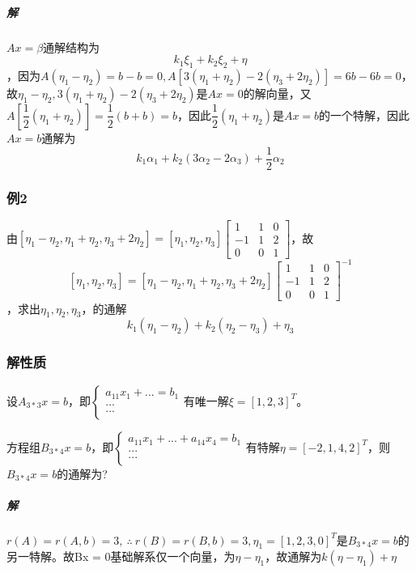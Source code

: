 \subparagraph{解}
\(Ax = \beta\)通解结构为\[k_1\xi_1 + k_2\xi_2 + \eta\]，因为\(A(\eta_1 - \eta_2) = b - b = 0, A[3(\eta_1 + \eta_2) - 2(\eta_3 + 2\eta_2)] = 6b - 6b = 0\)，故\(\eta_1 - \eta_2, 3(\eta_1 + \eta_2) - 2(\eta_3 + 2\eta_2)\)是\(Ax = 0\)的解向量，又\(A[\dfrac{1}{2}(\eta_1 + \eta_2)] = \dfrac{1}{2}(b + b) = b\)，因此\(\dfrac{1}{2}(\eta_1 + \eta_2)\)是\(Ax = b\)的一个特解，因此\(Ax = b\)通解为\[k_1\alpha_1 + k_2(3\alpha_2 - 2\alpha_3) + \dfrac{1}{2}\alpha_2\]

\subsubsection{例2}
由\([\eta_1 - \eta_2, \eta_1 + \eta_2, \eta_3 + 2\eta_2] = [\eta_1, \eta_2, \eta_3]\begin{bmatrix}
1 & 1 & 0 \\ 
-1 & 1 & 2 \\ 
0 & 0 & 1
\end{bmatrix}\)，故\[[\eta_1, \eta_2, \eta_3] = [\eta_1 - \eta_2, \eta_1 + \eta_2, \eta_3 + 2\eta_2]\begin{bmatrix}
1 & 1 & 0 \\ 
-1 & 1 & 2 \\ 
0 & 0 & 1
\end{bmatrix}^{-1}\]，求出\(\eta_1, \eta_2, \eta_3\)，的通解\[k_1(\eta_1 - \eta_2) + k_2(\eta_2 - \eta_3) + \eta_3\]


\subsubsection{解性质}
设\(A_{3 * 3}x = b\)，即\(\begin{cases}
    a_{11}x_1 + ... = b_1 \\ 
    ... \\ 
    ... \\ 
\end{cases}\)有唯一解\(\xi = [1, 2, 3]^T\)。

方程组\(B_{3 * 4}x = b\)，即\(\begin{cases}
    a_{11}x_1 + ... + a_{14}x_4 = b_1 \\ 
    ... \\ 
    ... \\ 
\end{cases}\)有特解\(\eta = [-2, 1, 4, 2]^T\)，则\(B_{3 * 4}x = b\)的通解为?

\subparagraph{解}
\(r(A) = r(A, b) = 3,\ \therefore\ r(B) = r(B, b) = 3, \eta_1 = [1, 2, 3, 0]^T\)是\(B_{3 * 4}x = b\)的另一特解。故Bx = 0基础解系仅一个向量，为\(\eta - \eta_1\)，故通解为\(k(\eta - \eta_1) + \eta\)



